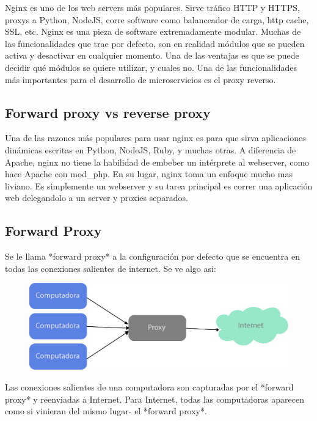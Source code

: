 Nginx es uno de los web servers más populares. Sirve tráfico HTTP y HTTPS, proxys a Python, NodeJS, corre software como balanceador de carga, http cache, SSL, etc.
Nginx es una pieza de software extremadamente modular. Muchas de las funcionalidades que trae por defecto, son en realidad módulos que se pueden activa y desactivar en cualquier momento. Una de las ventajas es que se puede decidir qué módulos se quiere utilizar, y cuales no.
Una de las funcionalidades más importantes para el desarrollo de microservicios es el proxy reverso.

\subsection[Forward proxy vs reverse proxy]{Forward proxy vs reverse proxy}

Una de las razones más populares para usar nginx es para que sirva aplicaciones dinámicas escritas en Python, NodeJS, Ruby, y muchas otras.
A diferencia de Apache, nginx no tiene la habilidad de embeber un intérprete al webserver, como hace Apache con mod\_php. En su lugar, nginx toma un enfoque mucho mas liviano. Es simplemente un webserver y su tarea principal es correr una aplicación web delegandolo a un server y proxies separados.

\subsection[Forward Proxy]{Forward Proxy}

Se le llama *forward proxy* a la configuración por defecto que se encuentra en todas las conexiones salientes de internet. Se ve algo asi:

\begin{figure}[h!]
  \centering
    \includegraphics[scale=0.7]{images/forward-proxy.png}
  \label{fig:forwardproxy}
\end{figure}

Las conexiones salientes de una computadora son capturadas por el *forward proxy* y reenviadas a Internet. Para Internet, todas las computadoras aparecen como si vinieran del mismo lugar- el *forward proxy*.


